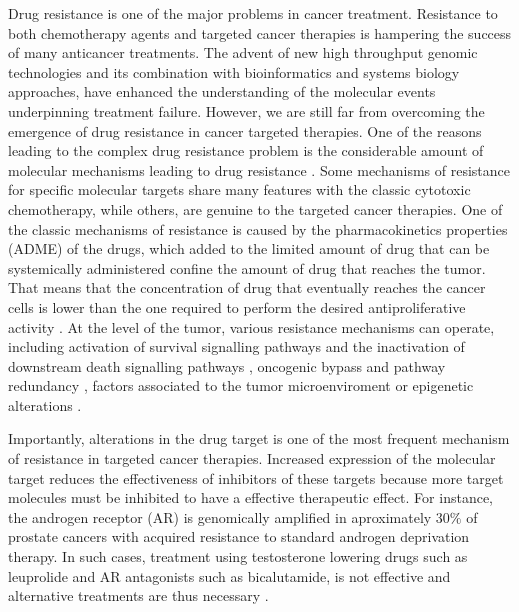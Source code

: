 \documentclass[11pt, b5paper,twoside]{tesi_upf}
\begin{document}
\par Drug resistance is one of the major problems in cancer treatment. Resistance to both chemotherapy agents and targeted cancer therapies is hampering the success of many anticancer treatments. The advent of new high throughput genomic technologies and its combination with bioinformatics and systems biology approaches, have enhanced the understanding of the molecular events underpinning treatment failure. However, we are still far from overcoming the emergence of drug resistance in cancer targeted therapies. One of the reasons leading to the complex drug resistance problem is the considerable amount of molecular mechanisms leading to drug resistance \cite{Holohan2013}. Some mechanisms of resistance for specific molecular targets share many features with the classic cytotoxic chemotherapy, while others, are genuine to the targeted cancer therapies. One of the classic mechanisms of resistance is caused by the pharmacokinetics properties (ADME) of the drugs, which added to the limited amount of drug that can be systemically administered confine the amount of drug that reaches the tumor. That means that the concentration of drug that eventually reaches the cancer cells is lower than the one required to perform the desired antiproliferative activity \cite{Gottesman2002}. At the level of the tumor, various resistance mechanisms can operate, including activation of survival signalling pathways and the inactivation of downstream death signalling pathways \cite{Lowe2004}, oncogenic bypass and pathway redundancy \cite{Logue2012}, factors associated to the tumor microenviroment \cite{McMillin2013} or epigenetic alterations \cite{Maier2005}.
\par Importantly, alterations in the drug target is one of the most frequent mechanism of resistance in targeted cancer therapies. Increased expression of the molecular target reduces the effectiveness of inhibitors of these targets because more target molecules must be inhibited to have a effective therapeutic effect. For instance, the androgen receptor (AR) is genomically amplified in aproximately 30$\%$ of prostate cancers with acquired resistance to standard androgen deprivation therapy. In such cases, treatment using testosterone lowering drugs such as leuprolide and AR antagonists such as bicalutamide, is not effective and alternative treatments are thus necessary \cite{Koivisto1997}. 
\end{document}
